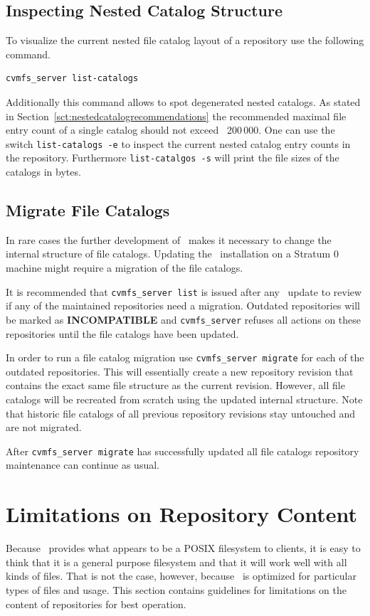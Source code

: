 \subsection{Inspecting Nested Catalog Structure}
\label{sct:inspectnestedcatalogs}
To visualize the current nested file catalog layout of a repository use the following command.

\begin{verbatim}
cvmfs_server list-catalogs
\end{verbatim}

Additionally this command allows to spot degenerated nested catalogs.
As stated in Section~\ref{sct:nestedcatalogrecommendations} the recommended maximal file entry count of a single catalog should not exceed ~200\,000.
One can use the switch \texttt{list-catalogs -e} to inspect the current nested catalog entry counts in the repository.
Furthermore \texttt{list-catalgos -s} will print the file sizes of the catalogs in bytes.

\subsection{Migrate File Catalogs}
In rare cases the further development of \cvmfs\ makes it necessary to change the internal structure of file catalogs.
Updating the \cvmfs\ installation on a Stratum 0 machine might require a migration of the file catalogs.

It is recommended that \texttt{cvmfs\_server list} is issued after any \cvmfs\ update to review if any of the maintained repositories need a migration.
Outdated repositories will be marked as \textbf{INCOMPATIBLE} and \texttt{cvmfs\_server} refuses all actions on these repositories until the file catalogs have been updated.

In order to run a file catalog migration use \texttt{cvmfs\_server migrate} for each of the outdated repositories.
This will essentially create a new repository revision that contains the exact same  file structure as the current revision.
However, all file catalogs will be recreated from scratch using the updated internal structure.
Note that historic file catalogs of all previous repository revisions stay untouched and are not migrated.

After \texttt{cvmfs\_server migrate} has successfully updated all file catalogs repository maintenance can continue as usual.

\section{Limitations on Repository Content}
Because \cvmfs\ provides what appears to be a POSIX filesystem to clients, it is easy to think that it is a general purpose filesystem and that it will work well with all kinds of files.
That is not the case, however, because \cvmfs\ is optimized for particular types of files and usage.  
This section contains guidelines for limitations on the content of repositories for best operation.

